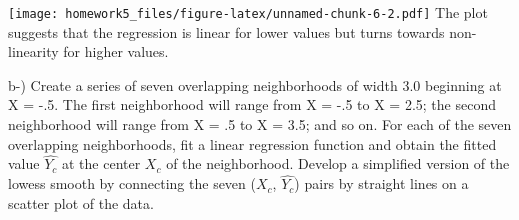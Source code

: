 \documentclass[
]{article}
\newenvironment{Shaded}{\begin{snugshade}}{\end{snugshade}}
\newcommand{\DataTypeTok}[1]{\textcolor[rgb]{0.13,0.29,0.53}{#1}}
\newcommand{\KeywordTok}[1]{\textcolor[rgb]{0.13,0.29,0.53}{\textbf{#1}}}
\newcommand{\NormalTok}[1]{#1}
\newcommand{\OperatorTok}[1]{\textcolor[rgb]{0.81,0.36,0.00}{\textbf{#1}}}
\newcommand{\StringTok}[1]{\textcolor[rgb]{0.31,0.60,0.02}{#1}}
\begin{document}
\begin{Shaded}
\end{Shaded}

\texttt{[image: homework5\_files/figure-latex/unnamed-chunk-6-2.pdf]} The
plot suggests that the regression is linear for lower values but turns
towards non-linearity for higher values.

b-) Create a series of seven overlapping neighborhoods of width 3.0
beginning at X = -.5. The first neighborhood will range from X = -.5 to
X = 2.5; the second neighborhood will range from X = .5 to X = 3.5; and
so on. For each of the seven overlapping neighborhoods, fit a linear
regression function and obtain the fitted value \(\hat{Y_{c}}\) at the
center \(X_{c}\) of the neighborhood. Develop a simplified version of
the lowess smooth by connecting the seven (\(X_c\), \(\hat{Y_{c}}\))
pairs by straight lines on a scatter plot of the data.
\end{document}
